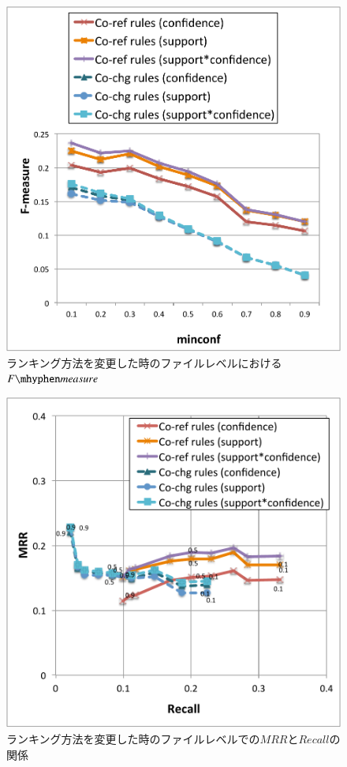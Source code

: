 \documentclass[a4paper]{jsbook}
\newcommand{\fmeasure}{F\mhyphen measure}
\begin{document}
\begin{figure}[p]
  \centering
  \includegraphics[width = 0.95\linewidth]{resource/fmeasure_rank_f.pdf}
  \caption{ランキング方法を変更した時のファイルレベルにおける$\fmeasure$}
  \label{f_fmeasure_rank}
\end{figure}
\begin{figure}[p]
  \centering
  \includegraphics[width = 0.95\linewidth]{resource/mrgraph_rank_f.pdf}
  \caption{ランキング方法を変更した時のファイルレベルでの$MRR$と$Recall$の関係}
  \label{f_mrgraph_rank}
\end{figure}
\end{document}
